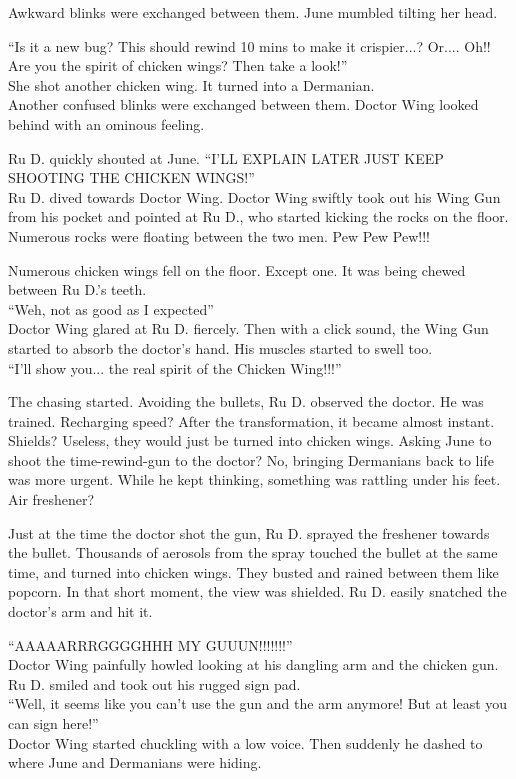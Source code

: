 Awkward blinks were exchanged between them. June mumbled tilting her head.

``Is it a new bug? This should rewind 10 mins to make it crispier...? Or.... Oh!! Are you the spirit of chicken wings? Then take a look!'' \\
She shot another chicken wing. It turned into a Dermanian. \\
Another confused blinks were exchanged between them. Doctor Wing looked behind with an ominous feeling. 

Ru D. quickly shouted at June.
``I'LL EXPLAIN LATER JUST KEEP SHOOTING THE CHICKEN WINGS!''  \\
Ru D. dived towards Doctor Wing. Doctor Wing swiftly took out his Wing Gun from his pocket and pointed at Ru D., who started kicking the rocks on the floor. Numerous rocks were floating between the two men.
Pew Pew Pew!!!

Numerous chicken wings fell on the floor. Except one. It was being chewed between Ru D.'s teeth. \\
``Weh, not as good as I expected'' \\
Doctor Wing glared at Ru D. fiercely. Then with a click sound, the Wing Gun started to absorb the doctor's hand. His muscles started to swell too. \\
``I'll show you... the real spirit of the Chicken Wing!!!''

The chasing started. Avoiding the bullets, Ru D. observed the doctor. He was trained. Recharging speed? After the transformation, it became almost instant. Shields? Useless, they would just be turned into chicken wings. Asking June to shoot the time-rewind-gun to the doctor? No, bringing Dermanians back to life was more urgent.
While he kept thinking, something was rattling under his feet. Air freshener?

Just at the time the doctor shot the gun, Ru D. sprayed the freshener towards the bullet. Thousands of aerosols from the spray touched the bullet at the same time, and turned into chicken wings. They busted and rained between them like popcorn. In that short moment, the view was shielded. Ru D. easily snatched the doctor's arm and hit it.

``AAAAARRRGGGGHHH MY GUUUN!!!!!!!'' \\
Doctor Wing painfully howled looking at his dangling arm and the chicken gun.
Ru D. smiled and took out his rugged sign pad. \\
``Well, it seems like you can't use the gun and the arm anymore! But at least you can sign here!'' \\
Doctor Wing started chuckling with a low voice. Then suddenly he dashed to where June and Dermanians were hiding.

